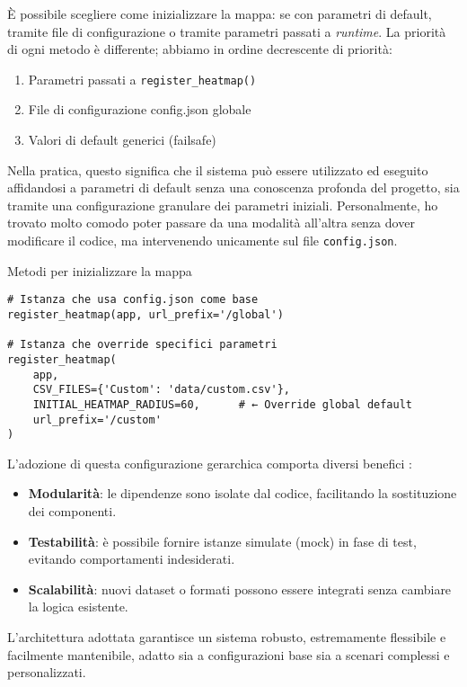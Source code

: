 È possibile scegliere come inizializzare la mappa: se con parametri di default, tramite file di configurazione o tramite parametri passati a \textit{runtime}. La priorità di ogni metodo è differente; abbiamo in ordine decrescente di priorità:

\begin{enumerate}
    \item Parametri passati a \texttt{register\_heatmap()}
    \item File di configurazione config.json globale
    \item Valori di default generici (failsafe)
\end{enumerate}
Nella pratica, questo significa che il sistema può essere utilizzato ed eseguito affidandosi a parametri di default senza una conoscenza profonda del progetto, sia tramite una configurazione granulare dei parametri iniziali. Personalmente, ho trovato molto comodo poter passare da una modalità all'altra senza dover modificare il codice, ma intervenendo unicamente sul file \texttt{config.json}.

\begin{listing}[H]
\caption{Metodi per inizializzare la mappa}
\label{lst:register_hm}
\begin{verbatim}
# Istanza che usa config.json come base
register_heatmap(app, url_prefix='/global')

# Istanza che override specifici parametri
register_heatmap(
    app, 
    CSV_FILES={'Custom': 'data/custom.csv'},
    INITIAL_HEATMAP_RADIUS=60,      # ← Override global default
    url_prefix='/custom'
)
\end{verbatim}
\end{listing}

L'adozione di questa configurazione gerarchica comporta diversi benefici \cite{dependency-injection-wiki}:

\begin{itemize}
  \item \textbf{Modularità}: le dipendenze sono isolate dal codice, facilitando la sostituzione dei componenti.
  \item \textbf{Testabilità}: è possibile fornire istanze simulate (mock) in fase di test, evitando comportamenti indesiderati.
  \item \textbf{Scalabilità}: nuovi dataset o formati possono essere integrati senza cambiare la logica esistente.
\end{itemize}

L'architettura adottata garantisce un sistema robusto, estremamente flessibile e facilmente mantenibile, adatto sia a configurazioni base sia a scenari complessi e personalizzati.

